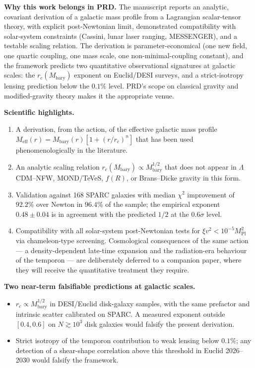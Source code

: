 \documentclass[11pt]{article}
\begin{document}
\textbf{Why this work belongs in PRD.}
The manuscript reports an analytic, covariant derivation of a galactic
mass profile from a Lagrangian scalar-tensor theory, with explicit
post-Newtonian limit, demonstrated compatibility with solar-system
constraints (Cassini, lunar laser ranging, MESSENGER), and a
testable scaling relation. The derivation is parameter-economical
(one new field, one quartic coupling, one mass scale, one
non-minimal-coupling constant), and the framework predicts two
quantitative observational signatures at galactic scales: the
$r_c(M_{\mathrm{bary}})$ exponent on Euclid/DESI surveys, and a
strict-isotropy lensing prediction below the $0.1\%$ level. PRD's
scope on classical gravity and modified-gravity theory makes it
the appropriate venue.

\bigskip

\textbf{Scientific highlights.}
\begin{enumerate}
  \item A derivation, from the action, of the effective galactic mass
    profile $M_{\mathrm{eff}}(r)=M_{\mathrm{bary}}(r)[1+(r/r_c)^{n}]$
    that has been used phenomenologically in the literature.
  \item An analytic scaling relation
    $r_c(M_{\mathrm{bary}})\propto M_{\mathrm{bary}}^{1/2}$ that does
    not appear in $\Lambda$CDM--NFW, MOND/TeVeS, $f(R)$, or
    Brans--Dicke gravity in this form.
  \item Validation against 168 SPARC galaxies with median $\chi^{2}$
    improvement of $92.2\%$ over Newton in $96.4\%$ of the sample;
    the empirical exponent $0.48\pm 0.04$ is in agreement with the
    predicted $1/2$ at the $0.6\sigma$ level.
  \item Compatibility with all solar-system post-Newtonian tests for
    $\xi v^{2}<10^{-5}M_{\mathrm{Pl}}^{2}$ via chameleon-type
    screening. Cosmological consequences of the same action --- a
    density-dependent late-time expansion and the radiation-era
    behaviour of the temporon --- are deliberately deferred to a
    companion paper, where they will receive the quantitative
    treatment they require.
\end{enumerate}

\bigskip

\textbf{Two near-term falsifiable predictions at galactic scales.}
\begin{itemize}
  \item $r_c\propto M_{\mathrm{bary}}^{1/2}$ in DESI/Euclid disk-galaxy
    samples, with the same prefactor and intrinsic scatter calibrated
    on SPARC. A measured exponent outside $[0.4,0.6]$ on
    $N\!\gtrsim\!10^{3}$ disk galaxies would falsify the present
    derivation.
  \item Strict isotropy of the temporon contribution to weak
    lensing below $0.1\%$; any detection of a shear-shape correlation
    above this threshold in Euclid 2026--2030 would falsify the
    framework.
\end{itemize}
\end{document}
